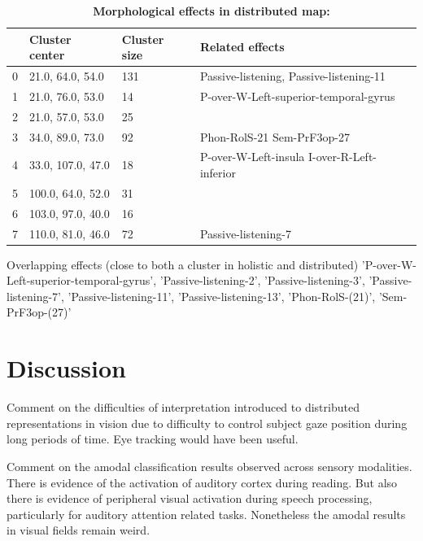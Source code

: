 \begin{table}
\begin{tabular}{llll}
\toprule
{} &       Cluster center & Cluster size &                                    Related effects \\
\midrule
0 &   21.0, 64.0, 54.0 &          131 &        Passive-listening, Passive-listening-11 \\
1 &   21.0, 76.0, 53.0 &           14 &  P-over-W-Left-superior-temporal-gyrus \\
2 &   21.0, 57.0, 53.0 &           25 &                                                  \\
3 &   34.0, 89.0, 73.0 &           92 &     Phon-RolS-21 Sem-PrF3op-27 \\
4 &  33.0, 107.0, 47.0 &           18 &  P-over-W-Left-insula I-over-R-Left-inferior \\
5 &  100.0, 64.0, 52.0 &           31 &                                                  \\
6 &  103.0, 97.0, 40.0 &           16 &                                                  \\
7 &  110.0, 81.0, 46.0 &           72 &                              Passive-listening-7 \\
\bottomrule
\end{tabular}
\caption{\textbf{Morphological effects in distributed map:}}
\label{table:distributed_effects}
\end{table}



Overlapping effects (close to both a cluster in holistic and distributed)
'P-over-W-Left-superior-temporal-gyrus',
'Passive-listening-2',
'Passive-listening-3',
'Passive-listening-7',
'Passive-listening-11',
'Passive-listening-13',
'Phon-RolS-(21)',
'Sem-PrF3op-(27)'



\section{Discussion}

Comment on the difficulties of interpretation introduced to distributed representations in vision due to difficulty to control subject gaze position during long periods of time. Eye tracking would have been useful.

Comment on the amodal classification results observed across sensory modalities. There is evidence of the activation of auditory cortex during reading. But also there is evidence of peripheral visual activation during speech processing, particularly for auditory attention related tasks. Nonetheless the amodal results in visual fields remain weird.

